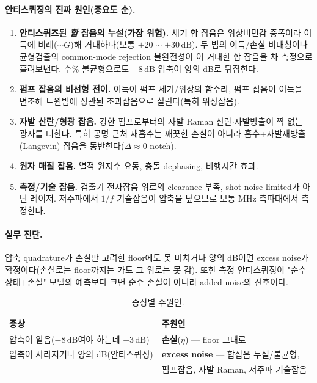 \documentclass[11pt,a4paper]{article}
\newcommand{\dB}{\,\mathrm{dB}}
\begin{document}
\paragraph{안티스퀴징의 진짜 원인(중요도 순).}
\begin{enumerate}[nosep]
\item \textbf{안티스퀴즈된 \emph{합} 잡음의 누설(가장 위험).} 세기 합 잡음은 위상비민감
      증폭이라 이득에 비례($\sim G$)해 거대하다(보통 $+20\sim+30\dB$). 두 빔의 이득/손실
      비대칭이나 균형검출의 common-mode rejection 불완전성이 이 거대한 합 잡음을 차 측정으로
      흘려보낸다. 수\% 불균형으로도 $-8\dB$ 압축이 양의 dB로 뒤집힌다.
\item \textbf{펌프 잡음의 비선형 전이.} 이득이 펌프 세기/위상의 함수라, 펌프 잡음이 이득을
      변조해 트윈빔에 상관된 초과잡음으로 실린다(특히 위상잡음).
\item \textbf{자발 산란/형광 잡음.} 강한 펌프로부터의 자발 Raman 산란$\cdot$자발방출이 짝 없는
      광자를 더한다. 특히 공명 근처 재흡수는 깨끗한 손실이 아니라 흡수+자발재방출(Langevin)
      잡음을 동반한다($\Delta\approx 0$ notch).
\item \textbf{원자 매질 잡음.} 열적 원자수 요동, 충돌 dephasing, 비행시간 효과.
\item \textbf{측정/기술 잡음.} 검출기 전자잡음 위로의 clearance 부족, shot-noise-limited가
      아닌 레이저. 저주파에서 $1/f$ 기술잡음이 압축을 덮으므로 보통 MHz 측파대에서 측정한다.
\end{enumerate}

\paragraph{실무 진단.}
압축 quadrature가 손실만 고려한 floor에도 못 미치거나 양의 dB이면 excess noise가
확정이다(손실로는 floor까지는 가도 그 위로는 못 감). 또한 측정 안티스퀴징이 "순수상태+손실"
모델의 예측보다 크면 순수 손실이 아니라 added noise의 신호이다.

\begin{table}[h]
\centering
\caption{증상별 주원인.}
\begin{tabular}{ll}
\toprule
증상 & 주원인\\
\midrule
압축이 얕음($-8\dB$여야 하는데 $-3\dB$) & \textbf{손실}($\eta$) --- floor 그대로\\
압축이 사라지거나 양의 dB(안티스퀴징) & \textbf{excess noise} --- 합잡음 누설/불균형,\\
 & 펌프잡음, 자발 Raman, 저주파 기술잡음\\
\bottomrule
\end{tabular}
\end{table}
\end{document}
